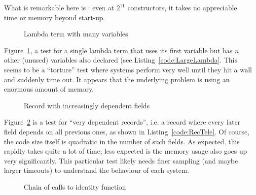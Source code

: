 \documentclass[a4paper,UKenglish,cleveref, autoref, thm-restate,anonymous]{lipics-v2021}
\begin{document}
What is remarkable here is \idris: even at \(2^{11}\) constructors, it takes no appreciable time
or memory beyond start-up.

\begin{figure}[h]
\begin{minipage}{0.50\textwidth}
\scalebox{0.75}{}
\end{minipage}
\begin{minipage}{0.50\textwidth}
\scalebox{0.75}{}
\end{minipage}
\caption{Lambda term with many variables}
\label{fig:Lambda}
\end{figure}

Figure~\ref{fig:Lambda}, a test for a single lambda term that uses its first
variable but has $n$ other (unused) variables also declared (see
Listing~\ref{code:LargeLambda}. This seems to be a ``torture'' test where
systems perform very well until they hit a wall and suddenly time out. It
appears that the underlying problem is using an enormous amount of memory.

\begin{figure}[h]
\begin{minipage}{0.50\textwidth}
\scalebox{0.75}{}
\end{minipage}
\begin{minipage}{0.50\textwidth}
\scalebox{0.75}{}
\end{minipage}
\caption{Record with increasingly dependent fields}
\label{fig:RecTele}
\end{figure}

Figure~\ref{fig:RecTele} is a test for ``very dependent records'', i.e. a record
where every later field depends on all previous ones, as shown in Listing~\ref{code:RecTele}.
Of course, the code size itself is quadratic in the number of such fields.  As expected,
this rapidly takes quite a lot of time; less expected is the memory usage also goes up
very significantly. This particular test likely needs finer sampling (and maybe larger
timeouts) to understand the behaviour of each system.

\begin{figure}[h]
\begin{minipage}{0.50\textwidth}
\scalebox{0.75}{}
\end{minipage}
\begin{minipage}{0.50\textwidth}
\scalebox{0.75}{}
\end{minipage}
\caption{Chain of calls to identity function}
\label{fig:IdChain}
\end{figure}
\end{document}
